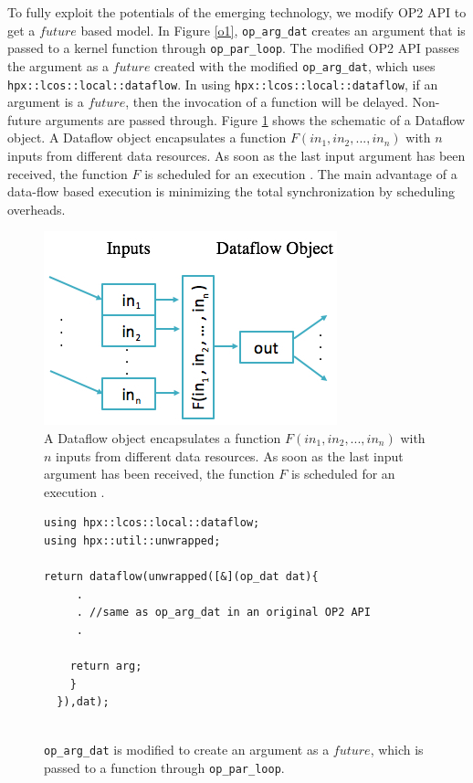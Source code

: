 \documentclass[conference]{IEEEtran}
\begin{document}
To fully exploit the potentials of the emerging technology, we modify OP2 API to get a $future$ based model. In Figure \ref{o1}, \texttt{op\_arg\_dat} creates an argument that is passed to a kernel function through \texttt{op\_par\_loop}. The modified OP2 API passes the argument as a $future$ created with the modified \texttt{op\_arg\_dat}, which uses \texttt{hpx::lcos::local::dataflow}. In using \texttt{hpx::lcos::local::dataflow}, if an argument is a $future$, then the invocation of a function will be delayed. Non-future arguments are passed through. Figure \ref{o3} shows the schematic of a Dataflow object. A  Dataflow object encapsulates a function $F(in_1,in_2,...,in_n)$ with $n$ inputs from different data resources. As soon as the last input argument has been received, the function $F$ is scheduled for an execution \cite{r7}. The main advantage of a data-flow based execution is minimizing the total synchronization by scheduling overheads. 


\begin{figure} 
\begin{center}
\centering
\includegraphics[width=0.65\columnwidth]{Pictures/tree.jpg}
\caption {A Dataflow object encapsulates a function $F(in_1,in_2,...,in_n)$ with $n$ inputs from different data resources. As soon as the last input argument has been received, the function $F$ is scheduled for an execution \cite{r7}.}
\label{o3}
\end{center}
\end{figure}

\begin{figure} 
    \begin{lstlisting}    
using hpx::lcos::local::dataflow;
using hpx::util::unwrapped;    

return dataflow(unwrapped([&](op_dat dat){
     .
     . //same as op_arg_dat in an original OP2 API
     .

    return arg;
    }
  }),dat);
  
    \end{lstlisting}
    \caption{\small{\texttt{op\_arg\_dat} is modified to create an argument as a $future$, which is passed to a function through \texttt{op\_par\_loop}.}}
    \label{o2}
\end{figure}
\end{document}
